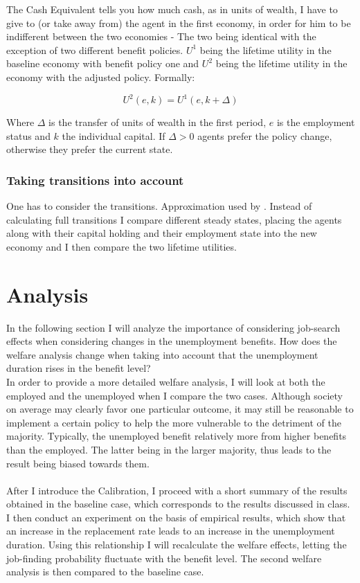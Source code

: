 \documentclass[a4paper,12pt]{article}
\begin{document}
The Cash Equivalent tells you how much cash, as in units of wealth, I have to give to (or take away from) the agent in the first economy, in order for him to be indifferent between the two economies - The two being identical with the exception of two different benefit policies. $U^{1}$ being the lifetime utility in the baseline economy with benefit policy one and $U^{2}$ being the lifetime utility in the economy with the adjusted policy. Formally: 

  \begin{equation}
  U^{2}(e,k) = U^{1}(e,k+\Delta) \nonumber
  \end{equation}

Where $\Delta$ is the transfer of units of wealth in the first period, $e$ is the employment status and $k$ the individual capital. If $ \Delta>0 $ agents prefer the policy change, otherwise they prefer the current state. 

\subsubsection*{Taking transitions into account}

One has to consider the transitions. Approximation used by \cite{KrusellMukoyamaSahin}. Instead of calculating full transitions I compare different steady states, placing the agents along with their capital holding and their employment state into the new economy and I then compare the two lifetime utilities. 




\section{Analysis}

In the following section I will analyze the importance of considering job-search effects when considering changes in the unemployment benefits. How does the welfare analysis change when taking into account that the unemployment duration rises in the benefit level? \\
In order to provide a more detailed welfare analysis, I will look at both the employed and the unemployed when I compare the two cases. Although society on average may clearly favor one particular outcome, it may still be reasonable to implement a certain policy to help the more vulnerable to the detriment of the majority. Typically, the unemployed benefit relatively more from higher benefits than the employed. The latter being in the larger majority, thus leads to the result being biased towards them. 
\\ \\
After I introduce the Calibration, I proceed with a short summary of the results obtained in the baseline case, which corresponds to the results discussed in class.
I then conduct an experiment on the basis of empirical results, which show that an increase in the replacement rate leads to an increase in the unemployment duration. Using this relationship I will recalculate the welfare effects, letting the job-finding probability fluctuate with the benefit level. The second welfare analysis is then compared to the baseline case. 
\end{document}

